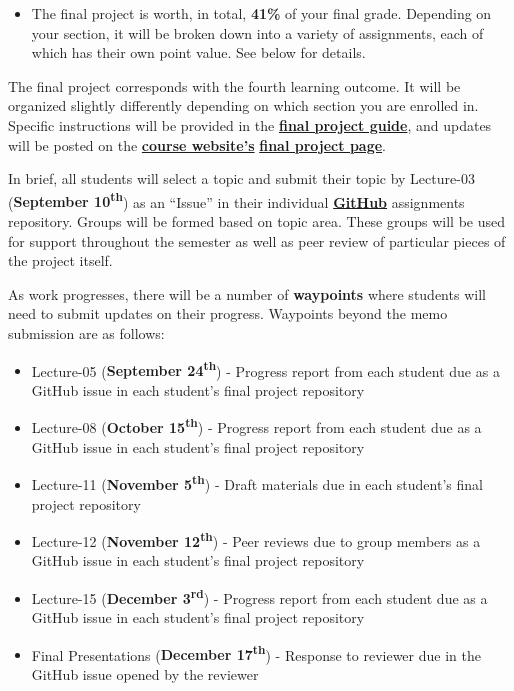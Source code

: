 \documentclass[]{book}
\providecommand{\tightlist}{%
  \setlength{\itemsep}{0pt}\setlength{\parskip}{0pt}}
\newenvironment{rmdblock}[1]
  {\begin{shaded*}
  \begin{itemize}
  \renewcommand{\labelitemi}{
    \raisebox{-.7\height}[0pt][0pt]{
      {\setkeys{Gin}{width=3em,keepaspectratio}\texttt{[image: images/\#1]}}
    }
  }
  \item
  }
  {
  \end{itemize}
  \end{shaded*}
  }
\newenvironment{rmdtip}
  {\begin{rmdblock}{tip}}
  {\end{rmdblock}}
\theoremstyle{definition}
\theoremstyle{definition}
\theoremstyle{definition}
\theoremstyle{remark}
\begin{document}
\begin{rmdtip}
The final project is worth, in total, \textbf{41\%} of your final grade.
Depending on your section, it will be broken down into a variety of
assignments, each of which has their own point value. See below for
details.
\end{rmdtip}

The final project corresponds with the fourth learning outcome. It will
be organized slightly differently depending on which section you are
enrolled in. Specific instructions will be provided in the
\href{https://slu-soc5050.github.io/finalGuide}{\textbf{final project
guide}}, and updates will be posted on the
\href{https://slu-soc5050.github.io/}{\textbf{course website's}}
\href{https://slu-soc5050.github.io/final-project}{\textbf{final project
page}}.

In brief, all students will select a topic and submit their topic by
Lecture-03 (\textbf{September 10\textsuperscript{th}}) as an ``Issue''
in their individual
\href{https://github.com/slu-soc5650}{\textbf{GitHub}} assignments
repository. Groups will be formed based on topic area. These groups will
be used for support throughout the semester as well as peer review of
particular pieces of the project itself.

As work progresses, there will be a number of \textbf{waypoints} where
students will need to submit updates on their progress. Waypoints beyond
the memo submission are as follows:

\begin{itemize}
\tightlist
\item
  Lecture-05 (\textbf{September 24\textsuperscript{th}}) - Progress
  report from each student due as a GitHub issue in each student's final
  project repository
\item
  Lecture-08 (\textbf{October 15\textsuperscript{th}}) - Progress report
  from each student due as a GitHub issue in each student's final
  project repository
\item
  Lecture-11 (\textbf{November 5\textsuperscript{th}}) - Draft materials
  due in each student's final project repository
\item
  Lecture-12 (\textbf{November 12\textsuperscript{th}}) - Peer reviews
  due to group members as a GitHub issue in each student's final project
  repository
\item
  Lecture-15 (\textbf{December 3\textsuperscript{rd}}) - Progress report
  from each student due as a GitHub issue in each student's final
  project repository
\item
  Final Presentations (\textbf{December 17\textsuperscript{th}}) -
  Response to reviewer due in the GitHub issue opened by the reviewer
\end{itemize}
\end{document}
